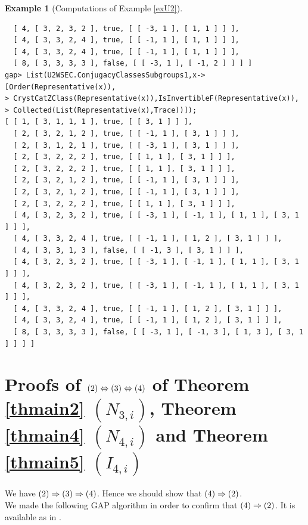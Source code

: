 \documentclass{amsart}
\theoremstyle{plain}
\theoremstyle{definition}
\newtheorem{example}[theorem]{Example}
\theoremstyle{remark}
\newcounter{sub}\def\tr{\mbox{tr }}
\begin{document}
\begin{example}[{Computations of Example \ref{exU2}}]
\begin{verbatim}
  [ 4, [ 3, 2, 3, 2 ], true, [ [ -3, 1 ], [ 1, 1 ] ] ], 
  [ 4, [ 3, 3, 2, 4 ], true, [ [ -1, 1 ], [ 1, 1 ] ] ], 
  [ 4, [ 3, 3, 2, 4 ], true, [ [ -1, 1 ], [ 1, 1 ] ] ], 
  [ 8, [ 3, 3, 3, 3 ], false, [ [ -3, 1 ], [ -1, 2 ] ] ] ]
gap> List(U2WSEC.ConjugacyClassesSubgroups1,x->[Order(Representative(x)),
> CrystCatZClass(Representative(x)),IsInvertibleF(Representative(x)),
> Collected(List(Representative(x),Trace))]);
[ [ 1, [ 3, 1, 1, 1 ], true, [ [ 3, 1 ] ] ], 
  [ 2, [ 3, 2, 1, 2 ], true, [ [ -1, 1 ], [ 3, 1 ] ] ], 
  [ 2, [ 3, 1, 2, 1 ], true, [ [ -3, 1 ], [ 3, 1 ] ] ], 
  [ 2, [ 3, 2, 2, 2 ], true, [ [ 1, 1 ], [ 3, 1 ] ] ], 
  [ 2, [ 3, 2, 2, 2 ], true, [ [ 1, 1 ], [ 3, 1 ] ] ], 
  [ 2, [ 3, 2, 1, 2 ], true, [ [ -1, 1 ], [ 3, 1 ] ] ], 
  [ 2, [ 3, 2, 1, 2 ], true, [ [ -1, 1 ], [ 3, 1 ] ] ], 
  [ 2, [ 3, 2, 2, 2 ], true, [ [ 1, 1 ], [ 3, 1 ] ] ], 
  [ 4, [ 3, 2, 3, 2 ], true, [ [ -3, 1 ], [ -1, 1 ], [ 1, 1 ], [ 3, 1 ] ] ], 
  [ 4, [ 3, 3, 2, 4 ], true, [ [ -1, 1 ], [ 1, 2 ], [ 3, 1 ] ] ], 
  [ 4, [ 3, 3, 1, 3 ], false, [ [ -1, 3 ], [ 3, 1 ] ] ], 
  [ 4, [ 3, 2, 3, 2 ], true, [ [ -3, 1 ], [ -1, 1 ], [ 1, 1 ], [ 3, 1 ] ] ], 
  [ 4, [ 3, 2, 3, 2 ], true, [ [ -3, 1 ], [ -1, 1 ], [ 1, 1 ], [ 3, 1 ] ] ], 
  [ 4, [ 3, 3, 2, 4 ], true, [ [ -1, 1 ], [ 1, 2 ], [ 3, 1 ] ] ], 
  [ 4, [ 3, 3, 2, 4 ], true, [ [ -1, 1 ], [ 1, 2 ], [ 3, 1 ] ] ], 
  [ 8, [ 3, 3, 3, 3 ], false, [ [ -3, 1 ], [ -1, 3 ], [ 1, 3 ], [ 3, 1 ] ] ] ]
\end{verbatim}
\end{example}

\section{Proofs of ${\rm (2)}\Leftrightarrow {\rm (3)}\Leftrightarrow {\rm (4)}$ of {Theorem \ref{thmain2}} $(N_{3,i})$, {Theorem \ref{thmain4}} $(N_{4,i})$ and {Theorem \ref{thmain5}} $(I_{4,i})$}\label{S10}

We have ${\rm (2)}\Rightarrow {\rm (3)}\Rightarrow {\rm (4)}$. 
Hence we should show that ${\rm (4)}\Rightarrow {\rm (2)}$.\\

We made the following GAP \cite{GAP} algorithm 
in order to confirm that ${\rm (4)}\Rightarrow {\rm (2)}$.  
It is available as in \cite{BCAlgTori}.\\
\end{document}
